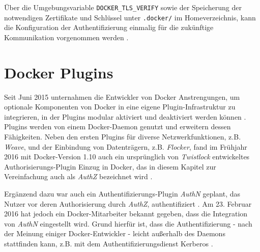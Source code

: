 \documentclass[../main.tex]{subfiles}
\begin{document}
    Über die Umgebungsvariable \texttt{DOCKER\_TLS\_VERIFY} sowie der Speicherung der notwendigen Zertifikate und Schlüssel unter \texttt{.docker/} im Homeverzeichnis, kann die Konfiguration der Authentifizierung einmalig für die zukünftige Kommunikation vorgenommen werden \cite{dockerSecurityHTTPS}.




  \section{Docker Plugins}
    Seit Juni 2015 unternahmen die Entwickler von Docker Anstrengungen, um optionale Komponenten von Docker in eine eigene Plugin-Infrastruktur zu integrieren, in der Plugins modular aktiviert und deaktiviert werden können \cite{githubDockerChangelog}\cite{dockerPlugins}. Plugins werden von einem Docker-Daemon genutzt und erweitern dessen Fähigkeiten. Neben den ersten Plugins für diverse Netzwerkfunktionen, z.B. \emph{Weave}, und der Einbindung von Datenträgern, z.B. \emph{Flocker}, fand im Frühjahr 2016 mit Docker-Version 1.10 auch ein ursprünglich von \emph{Twistlock}\cite{twistlock} entwickeltes Authorisierungs-Plugin Einzug in Docker, das in diesem Kapitel zur Vereinfachung auch als \emph{AuthZ} bezeichnet wird \cite{githubPluginList}\cite{dockerPlugins}\cite{authzTwistlock}.

    Ergänzend dazu war auch ein Authentifizierungs-Plugin \emph{AuthN} geplant, das Nutzer vor deren Authorisierung durch \emph{AuthZ}, authentifiziert \cite{githubAuthZDockerAccessControl}. Am 23. Februar 2016 hat jedoch ein Docker-Mitarbeiter bekannt gegeben, dass die Integration von \emph{AuthN} eingestellt wird. Grund hierfür ist, dass die Authentifizierung - nach der Meinung einiger Docker-Entwickler - leicht außerhalb des Daemons stattfinden kann, z.B. mit dem Authentifizierungsdienst Kerberos\cite{kerberos} \cite{githubAuthZKerberosSupport}\cite{githubAuthNLaydown}.
\end{document}
